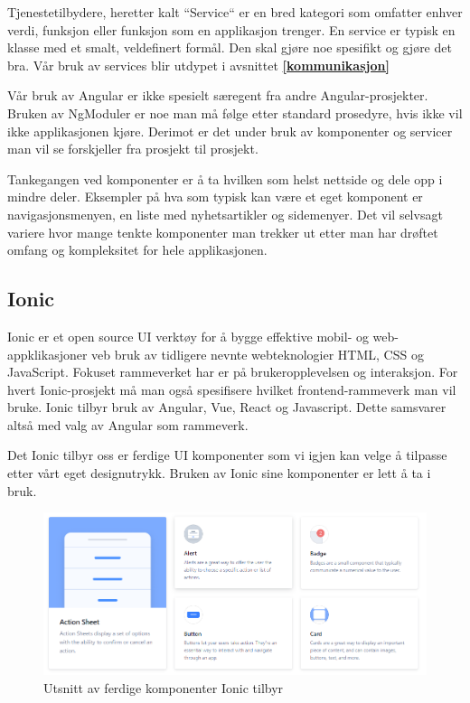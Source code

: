 Tjenestetilbydere, heretter kalt ``Service`` er en bred kategori som omfatter enhver verdi, funksjon eller funksjon som en applikasjon trenger. En service er typisk en klasse med et smalt, veldefinert formål. Den skal gjøre noe spesifikt og gjøre det bra. Vår bruk av services blir utdypet i avsnittet \textbf{\ref{kommunikasjon}} 

Vår bruk av Angular er ikke spesielt særegent fra andre Angular-prosjekter. Bruken av NgModuler er noe man må følge etter standard prosedyre, hvis ikke vil ikke applikasjonen kjøre. Derimot er det under bruk av komponenter og servicer man vil se forskjeller fra prosjekt til prosjekt. 


Tankegangen ved komponenter er å ta hvilken som helst nettside og dele opp i mindre deler. Eksempler på hva som typisk kan være et eget komponent er navigasjonsmenyen, en liste med nyhetsartikler og sidemenyer. Det vil selvsagt variere hvor mange tenkte komponenter man trekker ut etter man har drøftet omfang og kompleksitet for hele applikasjonen.




\subsection{\textbf{Ionic}}


Ionic er et open source UI verktøy for å bygge effektive mobil- og web-appklikasjoner veb bruk av tidligere nevnte webteknologier HTML, CSS og JavaScript. Fokuset rammeverket har er på brukeropplevelsen og interaksjon. For hvert Ionic-prosjekt må man også spesifisere hvilket frontend-rammeverk man vil bruke. Ionic tilbyr bruk av Angular, Vue, React og Javascript. Dette samsvarer altså med valg av Angular som rammeverk.

Det Ionic tilbyr oss er ferdige UI komponenter som vi igjen kan velge å tilpasse etter vårt eget designutrykk. Bruken av Ionic sine komponenter er lett å ta i bruk. 

\begin{figure}[H] 
    \centering
    \includegraphics[width=\textwidth]{figures/Tekniske-valg/Ionic/Ionic-Components.PNG}
    \caption{Utsnitt av ferdige komponenter Ionic tilbyr}
\end{figure}

